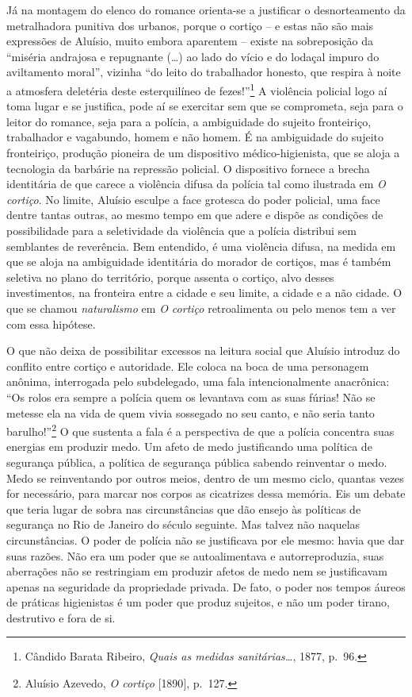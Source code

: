 Já na montagem do elenco do romance orienta-se a justificar o
desnorteamento da metralhadora punitiva dos urbanos, porque o cortiço --
e estas não são mais expressões de Aluísio, muito embora aparentem --
existe na sobreposição da ``miséria andrajosa e repugnante (\ldots{}) ao
lado do vício e do lodaçal impuro do aviltamento moral'', vizinha ``do
leito do trabalhador honesto, que respira à noite a atmosfera deletéria
deste esterquilíneo de fezes!''\footnote{Cândido Barata Ribeiro,
  \emph{Quais as medidas sanitárias\ldots{}}, 1877, p.~96.} A violência
policial logo aí toma lugar e se justifica, pode aí se exercitar sem que
se comprometa, seja para o leitor do romance, seja para a polícia, a
ambiguidade do sujeito fronteiriço, trabalhador e vagabundo, homem e não
homem. É na ambiguidade do sujeito fronteiriço, produção pioneira de um
dispositivo médico-higienista, que se aloja a tecnologia da barbárie na
repressão policial. O dispositivo fornece a brecha identitária de que
carece a violência difusa da polícia tal como ilustrada em \emph{O
cortiço}. No limite, Aluísio esculpe a face grotesca do poder policial,
uma face dentre tantas outras, ao mesmo tempo em que adere e dispõe as
condições de possibilidade para a seletividade da violência que a
polícia distribui sem semblantes de reverência. Bem entendido, é uma
violência difusa, na medida em que se aloja na ambiguidade identitária
do morador de cortiços, mas é também seletiva no plano do território,
porque assenta o cortiço, alvo desses investimentos, na fronteira entre
a cidade e seu limite, a cidade e a não cidade. O que se chamou
\emph{naturalismo} em \emph{O cortiço} retroalimenta ou pelo menos tem a
ver com essa hipótese.

O que não deixa de possibilitar excessos na leitura social que Aluísio
introduz do conflito entre cortiço e autoridade. Ele coloca na boca de
uma personagem anônima, interrogada pelo subdelegado, uma fala
intencionalmente anacrônica: ``Os rolos era sempre a polícia quem os
levantava com as suas fúrias! Não se metesse ela na vida de quem vivia
sossegado no seu canto, e não seria tanto barulho!''\footnote{Aluísio
  Azevedo, \emph{O cortiço} {[}1890{]}, p.~127.} O que sustenta a fala é
a perspectiva de que a polícia concentra suas energias em produzir medo.
Um afeto de medo justificando uma política de segurança pública, a
política de segurança pública sabendo reinventar o medo. Medo se
reinventando por outros meios, dentro de um mesmo ciclo, quantas vezes
for necessário, para marcar nos corpos as cicatrizes dessa memória. Eis
um debate que teria lugar de sobra nas circunstâncias que dão ensejo às
políticas de segurança no Rio de Janeiro do século seguinte. Mas talvez
não naquelas circunstâncias. O poder de polícia não se justificava por
ele mesmo: havia que dar suas razões. Não era um poder que se
autoalimentava e autorreproduzia, suas aberrações não se restringiam em
produzir afetos de medo nem se justificavam apenas na seguridade da
propriedade privada. De fato, o poder nos tempos áureos de práticas
higienistas é um poder que produz sujeitos, e não um poder tirano,
destrutivo e fora de si.

